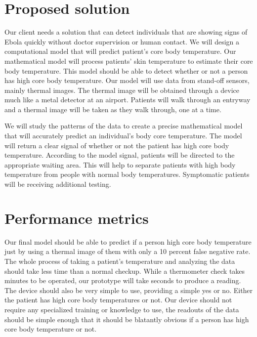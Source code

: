 \documentclass{article}
\begin{document}
\section{Proposed solution}
Our client needs a solution that can detect individuals that are showing signs of Ebola quickly without doctor supervision or human contact. We will design a computational model that will predict patient’s core body temperature. Our mathematical model will process patients’ skin temperature to estimate their core body temperature. This model should be able to detect whether or not a person has high core body temperature.  Our model will use data from stand-off sensors, mainly thermal images. The thermal image will be obtained through a device much like a metal detector at an airport. Patients will walk through an entryway and a thermal image will be taken as they walk through, one at a time. \par
We will study the patterns of the data to create a precise mathematical model that will accurately predict an individual’s body core temperature. The model will return a clear signal of whether or not the patient has high core body temperature. According to the model signal, patients will be directed to the appropriate waiting area. This will help to separate patients with high body temperature from people with normal body temperatures. Symptomatic patients will be receiving additional testing.



\section{Performance metrics}

Our final model should be able to predict if a person high core body temperature just by using a thermal image of them with only a 10 percent false negative rate. The whole process of taking a patient’s temperature and analyzing the data should take less time than a normal checkup. While a thermometer check takes minutes to be operated, our prototype will take seconds to produce a reading. The device should also be very simple to use, providing a simple yes or no. Either the patient has high core body temperatures or not. Our device should not require any specialized training or knowledge to use, the readouts of the data should be simple enough that it should be blatantly obvious if a person has high core body temperature or not.

 
\end{document}
